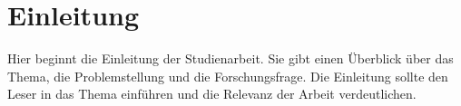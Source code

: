 \section{Einleitung} \label{sec:einleitung}

Hier beginnt die Einleitung der Studienarbeit. Sie gibt einen Überblick über das Thema, die Problemstellung und die Forschungsfrage. Die Einleitung sollte den Leser in das Thema einführen und die Relevanz der Arbeit verdeutlichen.



